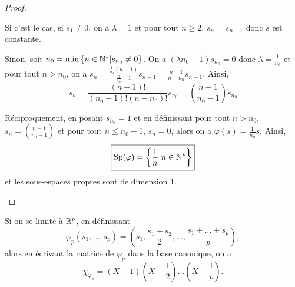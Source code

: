 \documentclass[12pt]{article}
\begin{document}
\begin{proof}
\begin{enumerate}
		Si c'est le cas, si $s_{1}\neq0$, on a $\lambda=1$ et pour tout $n\geqslant2$, $s_{n}=s_{n-1}$ donc $s$ est constante.

		Sinon, soit $n_{0}=\min\left\lbrace n\in\mathbb{N}^{*}\middle| s_{n_{0}}\neq0\right\rbrace$. On a $(\lambda n_{0}-1)s_{n_{0}}=0$ donc $\lambda=\frac{1}{n_{0}}$ et pour tout $n> n_{0}$, on a $s_{n}=\frac{\frac{1}{n_{0}}(n-1)}{\frac{n}{n_{0}}-1}s_{n-1}=\frac{n-1}{n-n_{0}}s_{n-1}$. Ainsi, 
		\begin{equation}
			s_{n}=\frac{(n-1)!}{(n_{0}-1)!(n-n_{0})!}s_{n_{0}}=\binom{n-1}{n_{0}-1}s_{n_{0}}
		\end{equation}

		Réciproquement, en posant $s_{n_{0}}=1$ et en définissant pour tout $n>n_{0}$, $s_{n}=\binom{n-1}{n_{0}-1}$ et pour tout $n\leqslant n_{0}-1$, $s_{n}=0$, alors on a $\varphi(s)=\frac{1}{n_{0}}s$. Ainsi, 
		\begin{equation}
			\boxed{
				\operatorname{Sp}(\varphi)=\left\lbrace\frac{1}{n}\middle| n\in\mathbb{N}^{*}\right\rbrace
			}
		\end{equation}
		et les sous-espaces propres sont de dimension 1.
	\end{enumerate}
\end{proof}

\begin{remark}
	Si on se limite à $\mathbb{R}^{p}$, en définissant 
	\begin{equation*}
		\varphi_{p}(s_{1},\dots,s_{p})=(s_{1},\frac{s_{1}+s_{2}}{2},\dots,\frac{s_{1}+\dots+s_{p}}{p}),	
	\end{equation*}
	alors en écrivant la matrice de $\varphi_{p}$ dans la base canonique, on a 
	\begin{equation*}
		\chi_{\varphi_{p}}=(X-1)(X-\frac{1}{2})\dots(X-\frac{1}{p}).
	\end{equation*}
\end{remark}
\end{document}
